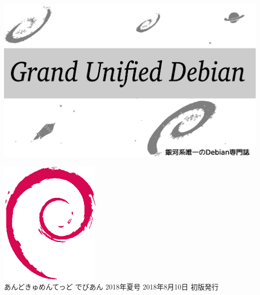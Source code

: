 \documentclass[mingoth,a4paper]{jsarticle}
\begin{document}
\begin{titlepage}
\thispagestyle{empty}

\hspace*{-2.5cm}
\includegraphics{image2012-natsu/gudeb.eps}\\
\vspace*{0.1cm}

\vspace*{2cm}

\vspace*{-1.5cm}
\hspace*{11cm}\includegraphics[height=6cm]{image200502/openlogo-nd.eps}\\
\vspace*{0.1cm}
\hfill あんどきゅめんてっど でびあん 2018年夏号 2018年8月10日 初版発行
\end{titlepage}

\newpage
\thispagestyle{empty}\mbox{}
\newpage
\end{document}
